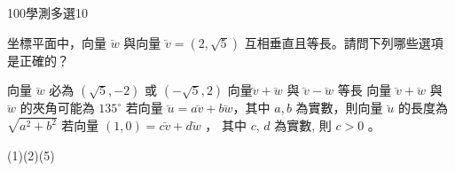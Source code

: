     \begin{QUESTION}
        \begin{ExamInfo}{100}{學測}{多選}{10}
        \end{ExamInfo}
        \begin{ExamAnsRateInfo}{37}{64}{33}{14}
        \end{ExamAnsRateInfo}
        \begin{QBODY}
            坐標平面中，向量 $\lvec{w}$ 與向量 $\lvec{v} = (2,\sqrt{5})$ 互相垂直且等長。請問下列哪些選項是正確的？
			\begin{QOPS} 
				\QOP 向量 $\lvec{w}$ 必為 $(\sqrt{5},-2)$ 或 $(-\sqrt{5},2)$ 
				\QOP 向量$\lvec{v}+\lvec{w}$ 與 $\lvec{v}-\lvec{w}$ 等長 
				\QOP 向量 $\lvec{v}+\lvec{w}$ 與 $\lvec{w}$ 的夾角可能為 $135^\circ$ 
				\QOP 若向量 $\lvec{u}=a \lvec{v}+b \lvec{w}$，其中 $a,b$ 為實數，則向量 $\lvec{u}$ 的長度為 $\sqrt{a^2 +b^2}$ 
				\QOP 若向量 $(1,0)=c\lvec{v}+d \lvec{w}$ ， 其中 $c$, $d$ 為實數, 則 $c>0$ 。
			\end{QOPS}
        \end{QBODY}
        \begin{QFROMS}
        \end{QFROMS}
        \begin{QTAGS}\end{QTAGS}
        \begin{QANS}
            (1)(2)(5)
        \end{QANS}
        \begin{QSOLLIST}
        \end{QSOLLIST}
        \begin{QEMPTYSPACE}
        \end{QEMPTYSPACE}
    \end{QUESTION}
